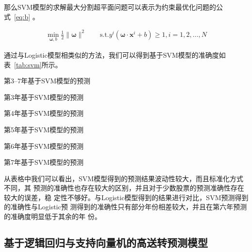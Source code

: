 \documentclass[../main]{subfiles}
\begin{document}
那么SVM模型的求解最大分割超平面问题可以表示为约束最优化问题的公式~\ref{eq:b}
。

\begin{align}
  \label{eq:b}
  \min_{\bm{\omega}, b}
  \frac{1}{2}\lVert\bm{\omega}\rVert^2\qquad\mathrm{s.t.}
  y^i(\bm{\omega}\cdot\bm{x}^i + b)\geqslant 1, i = 1, 2, \dots, N
\end{align}

通过与Logistic模型相类似的方法，我们可以得到基于SVM模型的准确度如
表~\ref{tab:svm}所示。

\begin{table}[htpb]
  \centering
  \caption{第3--7年基于SVM模型的预测}%
  \label{tab:svm}
  \setlength\tabcolsep{2pt}
  \begin{subtable}[htbp]{0.45\linewidth}
    \centering
    \caption{第3年基于SVM模型的预测}%
    \label{tab:svm3}
  \end{subtable}
  \qquad
  \begin{subtable}[htbp]{0.45\linewidth}
    \centering
    \caption{第4年基于SVM模型的预测}%
    \label{tab:svm4}
  \end{subtable}

  \begin{subtable}[htbp]{0.45\linewidth}
    \centering
    \caption{第5年基于SVM模型的预测}%
    \label{tab:svm5}
  \end{subtable}
  \qquad
  \begin{subtable}[htbp]{0.45\linewidth}
    \centering
    \caption{第6年基于SVM模型的预测}%
    \label{tab:svm6}
  \end{subtable}

  \begin{subtable}[htbp]{0.45\linewidth}
    \centering
    \caption{第7年基于SVM模型的预测}%
    \label{tab:svm7}
  \end{subtable}
\end{table}

从表格中我们可以看出，SVM模型得到的预测结果波动性较大，而且标准化方式不同，其
预测的准确性也存在较大的区别，并且对于少数股票的预测准确性存在较大的误差，稳
定性不够好。与Logistic模型得到的结果进行对比，SVM预测得到的准确性与Logistic预
测得到的准确性只有部分年份相差较大，并且在第六年预测的准确度明显低于其余的年
份。

\subsection{基于逻辑回归与支持向量机的高送转预测模型}%
\label{sub:logistic_svm}
\end{document}

